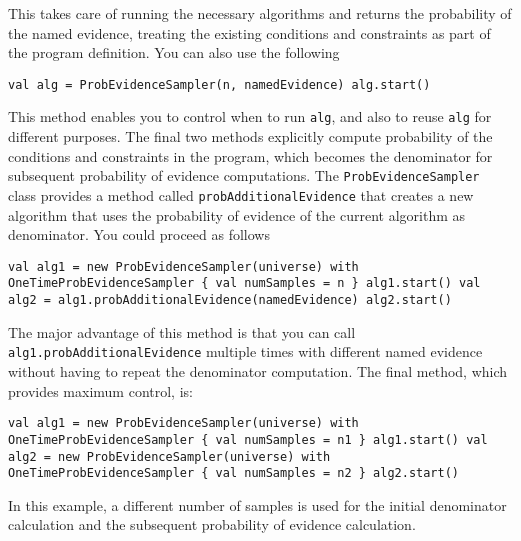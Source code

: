 This takes care of running the necessary algorithms and returns the probability of the named evidence, treating the existing conditions and constraints as part of the program definition. You can also use the following

\begin{flushleft}
\texttt{val alg = ProbEvidenceSampler(n, namedEvidence)
\newline alg.start()
}
\end{flushleft}

This method enables you to control when to run \texttt{alg}, and also to reuse \texttt{alg} for different purposes. The final two methods explicitly compute probability of the conditions and constraints in the program, which becomes the denominator for subsequent probability of evidence computations. The \texttt{ProbEvidenceSampler} class provides a method called \texttt{probAdditionalEvidence} that creates a new algorithm that uses the probability of evidence of the current algorithm as denominator. You could proceed as follows

\begin{flushleft}
\texttt{val alg1 = new ProbEvidenceSampler(universe) with
\newline \tab OneTimeProbEvidenceSampler \{ val numSamples = n \}
\newline alg1.start()
\newline val alg2 = alg1.probAdditionalEvidence(namedEvidence)
\newline alg2.start()
}
\end{flushleft}

The major advantage of this method is that you can call \texttt{alg1.prob\-AdditionalEvidence} multiple times with different named evidence without having to repeat the denominator computation. The final method, which provides maximum control, is:

\begin{flushleft}
\texttt{val alg1 = new ProbEvidenceSampler(universe) with
\newline \tab OneTimeProbEvidenceSampler \{ val numSamples = n1 \}
\newline alg1.start()
\newline val alg2 = new ProbEvidenceSampler(universe) with
\newline \tab OneTimeProbEvidenceSampler \{ val numSamples = n2 \}
\newline alg2.start()
}
\end{flushleft}

In this example, a different number of samples is used for the initial denominator calculation and the subsequent probability of evidence calculation.

